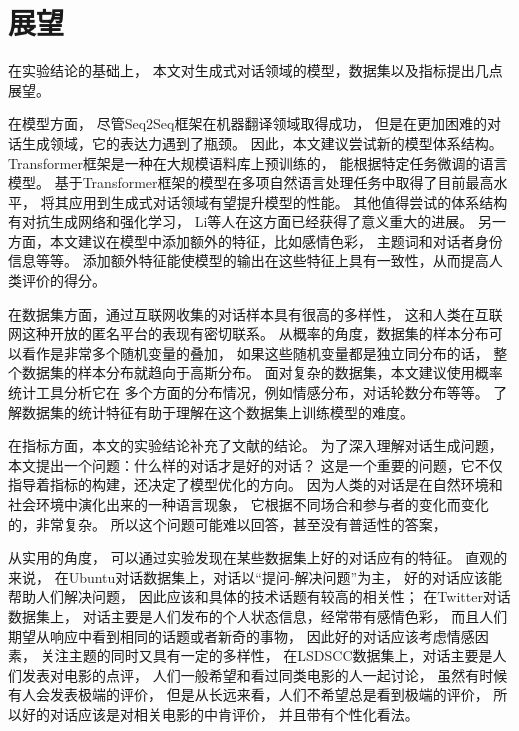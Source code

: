 \section*{展望}\label{sec:future_work}
在实验结论的基础上，
本文对生成式对话领域的模型，数据集以及指标提出几点展望。

在模型方面， 尽管Seq2Seq框架在机器翻译领域取得成功，
但是在更加困难的对话生成领域，它的表达力遇到了瓶颈。
因此，本文建议尝试新的模型体系结构。
Transformer框架是一种在大规模语料库上预训练的，
能根据特定任务微调的语言模型。
基于Transformer框架的模型在多项自然语言处理任务中取得了目前最高水平，
将其应用到生成式对话领域有望提升模型的性能。
其他值得尝试的体系结构有对抗生成网络和强化学习，
Li等人在这方面已经获得了意义重大的进展。
另一方面，本文建议在模型中添加额外的特征，比如感情色彩，
主题词和对话者身份信息等等。
添加额外特征能使模型的输出在这些特征上具有一致性，从而提高人类评价的得分。

在数据集方面，通过互联网收集的对话样本具有很高的多样性，
这和人类在互联网这种开放的匿名平台的表现有密切联系。
从概率的角度，数据集的样本分布可以看作是非常多个随机变量的叠加，
如果这些随机变量都是独立同分布的话，
整个数据集的样本分布就趋向于高斯分布。
面对复杂的数据集，本文建议使用概率统计工具分析它在
多个方面的分布情况，例如情感分布，对话轮数分布等等。
了解数据集的统计特征有助于理解在这个数据集上训练模型的难度。

在指标方面，本文的实验结论补充了文献\cite{HowNot}的结论。
为了深入理解对话生成问题，本文提出一个问题：什么样的对话才是好的对话？
这是一个重要的问题，它不仅指导着指标的构建，还决定了模型优化的方向。
因为人类的对话是在自然环境和社会环境中演化出来的一种语言现象，
它根据不同场合和参与者的变化而变化的，非常复杂。
所以这个问题可能难以回答，甚至没有普适性的答案，

从实用的角度，
可以通过实验发现在某些数据集上好的对话应有的特征。
直观的来说，
在Ubuntu对话数据集上，对话以“提问-解决问题”为主，
好的对话应该能帮助人们解决问题，
因此应该和具体的技术话题有较高的相关性；
在Twitter对话数据集上，
对话主要是人们发布的个人状态信息，经常带有感情色彩，
而且人们期望从响应中看到相同的话题或者新奇的事物，
因此好的对话应该考虑情感因素，
关注主题的同时又具有一定的多样性，
在LSDSCC数据集上，对话主要是人们发表对电影的点评，
人们一般希望和看过同类电影的人一起讨论，
虽然有时候有人会发表极端的评价，
但是从长远来看，人们不希望总是看到极端的评价，
所以好的对话应该是对相关电影的中肯评价，
并且带有个性化看法。

